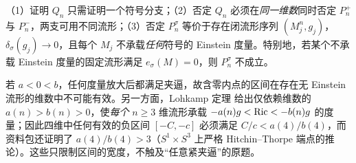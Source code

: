 \begin{corollary}\label{cor:logic}
（1）证明 $Q_n$ 只需证明一个符号分支；（2）否定 $Q_n$ 必须在\emph{同一维数}同时否定 $P_n^+$ 与 $P_n^-$，两支可用不同流形；（3）否定 $P_n^\sigma$ 等价于存在闭流形序列 $(M_j^n,g_j)$，$\delta_\sigma(g_j)\to0$，且每个 $M_j$ 不承载\emph{任何}符号的 Einstein 度量。特别地，若某个不承载 Einstein 度量的固定流形满足 $e_\sigma(M)=0$，则 $P_n^\sigma$ 不成立。
\end{corollary}

\begin{remark}[含零区间与固定宽度]
若 $a<0<b$，任何度量放大后都满足夹逼，故含零内点的区间在存在无 Einstein 流形的维数中不可能有效。另一方面，Lohkamp 定理 \cite{Lohkamp} 给出仅依赖维数的 $a(n)>b(n)>0$，使\emph{每个} $n\ge3$ 维流形承载 $-a(n)g<\operatorname{Ric}<-b(n)g$ 的度量；因此四维中任何有效的负区间 $[-C,-c]$ 必须满足 $C/c<a(4)/b(4)$，而资料包还证明了 $a(4)/b(4)>3$（$S^1\times S^3$ 上严格 Hitchin--Thorpe 端点的推论）。这些只限制区间的宽度，不触及“任意紧夹逼”的原题。
\end{remark}
